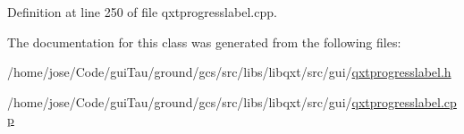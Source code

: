 Definition at line 250 of file qxtprogresslabel.\-cpp.



The documentation for this class was generated from the following files\-:\begin{DoxyCompactItemize}
\item 
/home/jose/\-Code/gui\-Tau/ground/gcs/src/libs/libqxt/src/gui/\hyperlink{qxtprogresslabel_8h}{qxtprogresslabel.\-h}\item 
/home/jose/\-Code/gui\-Tau/ground/gcs/src/libs/libqxt/src/gui/\hyperlink{qxtprogresslabel_8cpp}{qxtprogresslabel.\-cpp}\end{DoxyCompactItemize}
